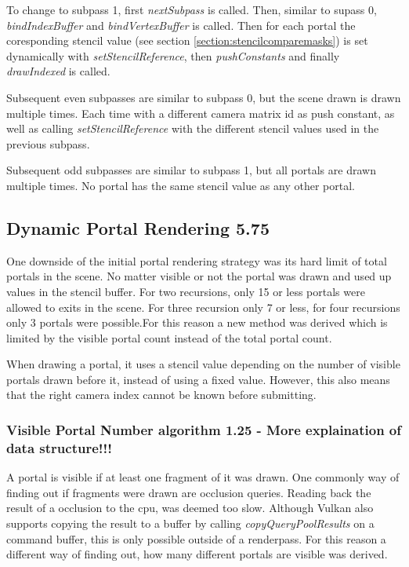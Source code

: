 To change to subpass 1, first \textit{nextSubpass} is called. Then, similar to supass 0, \textit{bindIndexBuffer} and \textit{bindVertexBuffer} is called.  Then for each portal the coresponding stencil value (see section \ref{section:stencilcomparemasks}) is set dynamically with \textit{setStencilReference}, then \textit{pushConstants} and finally \textit{drawIndexed} is called.

Subsequent even subpasses are similar to subpass 0, but the scene drawn is drawn multiple times. Each time with a different camera matrix id as push constant, as well as calling \textit{setStencilReference} with the different stencil values used in the previous subpass.

Subsequent odd subpasses are similar to subpass 1, but all portals are drawn multiple times. No portal has the same stencil value as any other portal.


\subsection{Dynamic Portal Rendering 5.75}
One downside of the initial portal rendering strategy was its hard limit of total portals in the scene. No matter visible or not the portal was drawn and used up values in the stencil buffer. For two recursions, only 15 or less portals were allowed to exits in the scene. For three recursion only 7 or less, for four recursions only 3 portals were possible.For this reason a new method was derived which is limited by the visible portal count instead of the total portal count. 

When drawing a portal, it uses a stencil value depending on the number of visible portals drawn before it, instead of using a fixed value. However, this also means that the right camera index cannot be known before submitting.

\subsubsection{Visible Portal Number algorithm 1.25 - More explaination of data structure!!!}
\label{section:visibleportalcount}
A portal is visible if at least one fragment of it was drawn. One commonly way of finding out if fragments were drawn are occlusion queries. Reading back the result of a occlusion to the \gls{cpu}, was deemed too slow. Although Vulkan also supports copying the result to a buffer by calling \textit{copyQueryPoolResults} on a command buffer, this is only possible outside of a renderpass. For this reason a different way of finding out, how many different portals are visible was derived.

